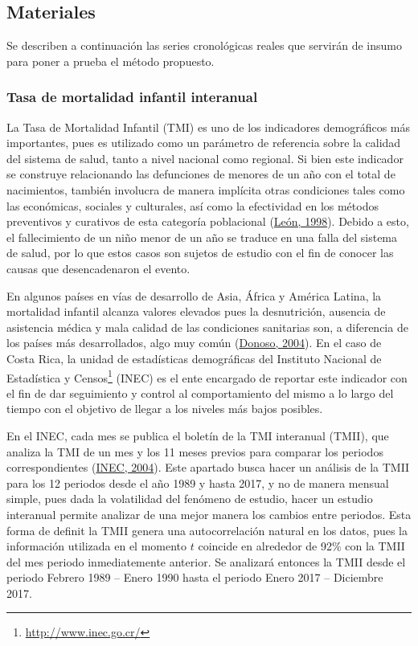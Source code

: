 \documentclass[
]{article}
\begin{document}
\subsection{Materiales}

Se describen a continuación las series cronológicas reales que servirán
de insumo para poner a prueba el método propuesto.

\subsubsection{Tasa de mortalidad infantil interanual}

La Tasa de Mortalidad Infantil (TMI) es uno de los indicadores
demográficos más importantes, pues es utilizado como un parámetro de
referencia sobre la calidad del sistema de salud, tanto a nivel nacional
como regional. Si bien este indicador se construye relacionando las
defunciones de menores de un año con el total de nacimientos, también
involucra de manera implícita otras condiciones tales como las
económicas, sociales y culturales, así como la efectividad en los
métodos preventivos y curativos de esta categoría poblacional
(\protect\hyperlink{ref-leon}{León, 1998}). Debido a esto, el
fallecimiento de un niño menor de un año se traduce en una falla del
sistema de salud, por lo que estos casos son sujetos de estudio con el
fin de conocer las causas que desencadenaron el evento.

En algunos países en vías de desarrollo de Asia, África y América
Latina, la mortalidad infantil alcanza valores elevados pues la
desnutrición, ausencia de asistencia médica y mala calidad de las
condiciones sanitarias son, a diferencia de los países más
desarrollados, algo muy común (\protect\hyperlink{ref-donoso}{Donoso,
2004}). En el caso de Costa Rica, la unidad de estadísticas demográficas
del Instituto Nacional de Estadística y Censos\footnote{\url{http://www.inec.go.cr/}}
(INEC) es el ente encargado de reportar este indicador con el fin de dar
seguimiento y control al comportamiento del mismo a lo largo del tiempo
con el objetivo de llegar a los niveles más bajos posibles.

En el INEC, cada mes se publica el boletín de la TMI interanual (TMII),
que analiza la TMI de un mes y los 11 meses previos para comparar los
periodos correspondientes (\protect\hyperlink{ref-infantiles}{INEC,
2004}). Este apartado busca hacer un análisis de la TMII para los 12
periodos desde el año 1989 y hasta 2017, y no de manera mensual simple,
pues dada la volatilidad del fenómeno de estudio, hacer un estudio
interanual permite analizar de una mejor manera los cambios entre
periodos. Esta forma de definit la TMII genera una autocorrelación
natural en los datos, pues la información utilizada en el momento \(t\)
coincide en alrededor de 92\% con la TMII del mes periodo inmediatemente
anterior. Se analizará entonces la TMII desde el periodo Febrero 1989 --
Enero 1990 hasta el periodo Enero 2017 -- Diciembre 2017.
\end{document}

